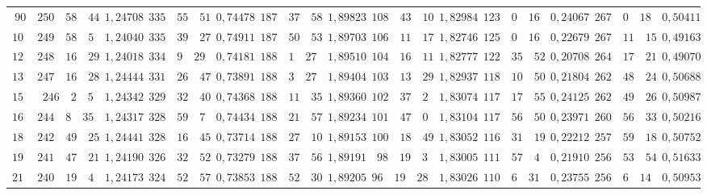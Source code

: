 \begin{landscape}
\begin{center}
\begin{tabular}{r|r|r|r|r|r|r|r|r|r|r|r|r}
\(90\) & \(250\quad 58\quad 44\) & \(1{,}24708\) & \(335\quad 55\quad 51\) & \(0{,}74478\) & \(187\quad 37\quad 58\) & \(1{,}89823\) & \(108\quad 43\quad 10\) & \(1{,}82984\) & \(123\quad 0\quad 16\) & \(0{,}24067\) & \(267\quad 0\quad 18\) & \(0{,}50411\) \\
\(105\) & \(249\quad 58\quad 5\) & \(1{,}24040\) & \(335\quad 39\quad 27\) & \(0{,}74911\) & \(187\quad 50\quad 53\) & \(1{,}89703\) & \(106\quad 11\quad 17\) & \(1{,}82746\) & \(125\quad 0\quad 16\) & \(0{,}22679\) & \(267\quad 11\quad 15\) & \(0{,}49163\) \\[3pt]
\(120\) & \(248\quad 16\quad 29\) & \(1{,}24018\) & \(334\quad 9\quad 29\) & \(0{,}74181\) & \(188\quad 1\quad 27\) & \(1{,}89510\) & \(104\quad 16\quad 11\) & \(1{,}82777\) & \(122\quad 35\quad 52\) & \(0{,}20708\) & \(264\quad 17\quad 21\) & \(0{,}49070\) \\
\(135\) & \(247\quad 16\quad 28\) & \(1{,}24444\) & \(331\quad 26\quad 47\) & \(0{,}73891\) & \(188\quad 3\quad 27\) & \(1{,}89404\) & \(103\quad 13\quad 29\) & \(1{,}82937\) & \(118\quad 10\quad 50\) & \(0{,}21804\) & \(262\quad 48\quad 24\) & \(0{,}50688\) \\
\(150\) & \(246\quad 2\quad 5\) & \(1{,}24342\) & \(329\quad 32\quad 40\) & \(0{,}74368\) & \(188\quad 11\quad 35\) & \(1{,}89360\) & \(102\quad 37\quad 2\) & \(1{,}83074\) & \(117\quad 17\quad 55\) & \(0{,}24125\) & \(262\quad 49\quad 26\) & \(0{,}50987\) \\
\(165\) & \(244\quad 8\quad 35\) & \(1{,}24317\) & \(328\quad 59\quad 7\) & \(0{,}74434\) & \(188\quad 21\quad 57\) & \(1{,}89234\) & \(101\quad 47\quad 0\) & \(1{,}83104\) & \(117\quad 56\quad 50\) & \(0{,}23971\) & \(260\quad 56\quad 33\) & \(0{,}50216\) \\[3pt]
\(180\) & \(242\quad 49\quad 25\) & \(1{,}24441\) & \(328\quad 16\quad 45\) & \(0{,}73714\) & \(188\quad 27\quad 10\) & \(1{,}89153\) & \(100\quad 18\quad 49\) & \(1{,}83052\) & \(116\quad 31\quad 19\) & \(0{,}22212\) & \(257\quad 59\quad 18\) & \(0{,}50752\) \\
\(195\) & \(241\quad 47\quad 21\) & \(1{,}24190\) & \(326\quad 32\quad 52\) & \(0{,}73279\) & \(188\quad 37\quad 56\) & \(1{,}89191\) & \(98\quad 19\quad 3\) & \(1{,}83005\) & \(111\quad 57\quad 4\) & \(0{,}21910\) & \(256\quad 53\quad 54\) & \(0{,}51633\) \\
\(210\) & \(240\quad 19\quad 4\) & \(1{,}24173\) & \(324\quad 52\quad 57\) & \(0{,}73853\) & \(188\quad 52\quad 30\) & \(1{,}89205\) & \(96\quad 19\quad 28\) & \(1{,}83026\) & \(110\quad 6\quad 31\) & \(0{,}23755\) & \(256\quad 6\quad 14\) & \(0{,}50953\) \\

\end{tabular}
\end{center}
\end{landscape}
